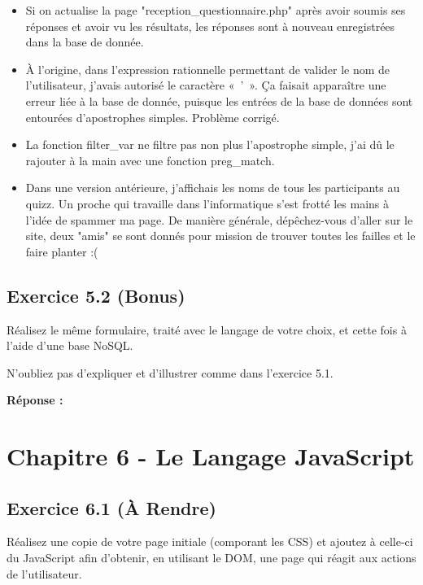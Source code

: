 \documentclass[11pt]{article}
\begin{document}
\begin{itemize}
	\item Si on actualise la page "reception\_questionnaire.php" après avoir soumis ses réponses et avoir vu les résultats, les réponses sont à nouveau enregistrées dans la base de donnée.
	
	\item À l’origine, dans l’expression rationnelle permettant de valider le nom de l’utilisateur, j’avais autorisé le caractère «~'~». Ça faisait apparaître une erreur liée à la base de donnée, puisque les entrées de la base de données sont entourées d’apostrophes simples. Problème corrigé.
	
	\item La fonction {\sffamily filter\_var} ne filtre pas non plus l’apostrophe simple, j’ai dû le rajouter à la main avec une fonction {\sffamily preg\_match}.
	
	\item Dans une version antérieure, j’affichais les noms de tous les participants au quizz. Un proche qui travaille dans l’informatique s’est frotté les mains à l’idée de spammer ma page. De manière générale, dépêchez-vous d’aller sur le site, deux "amis" se sont donnés pour mission de trouver toutes les failles et le faire planter :(
\end{itemize}

	\subsection*{Exercice 5.2 (Bonus)}

Réalisez le même formulaire, traité avec le langage de votre choix, et cette fois à l’aide d’une base NoSQL.

N’oubliez pas d’expliquer et d’illustrer comme dans l’exercice 5.1.

\textbf{Réponse :}

\section*{Chapitre 6 - Le Langage JavaScript}

	\subsection*{Exercice 6.1 (À Rendre)}

Réalisez une copie de votre page initiale (comporant les CSS) et ajoutez à celle-ci du JavaScript afin d’obtenir, en utilisant le DOM, une page qui réagit aux actions de l’utilisateur.
\end{document}
